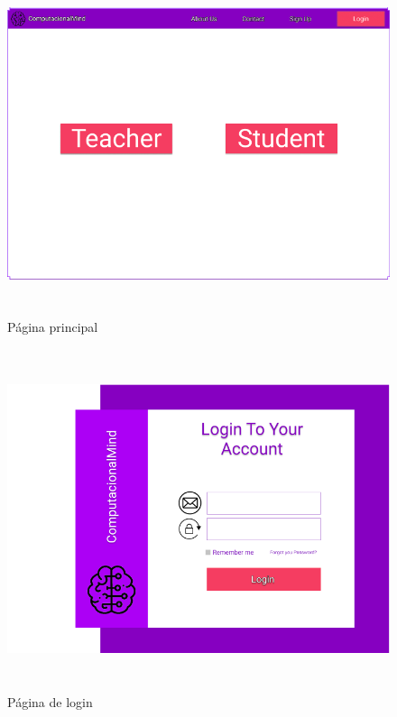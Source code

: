\documentclass[11pt,a4paper]{report}
\begin{document}
\begin{figure}[H]
\centering
\includegraphics[width = 14cm,height = 10cm]{MockHome.png}
\caption{Página principal}
\label{fig:MockHome}
\end{figure}

\begin{figure}[H]
\centering
\includegraphics[width = 14cm,height = 10cm]{MockLogin.png}
\caption{Página de login}
\label{fig:MockLogin}
\end{figure}
\end{document}
